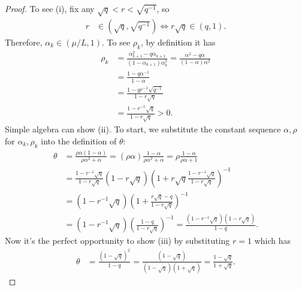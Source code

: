 \documentclass[12pt]{article}
\begin{document}
    \begin{proof}
        To see (i), fix any $\sqrt{q} < r < \sqrt{q^{-1}}$, so
        \begin{align*}
            r &\in \left(\sqrt{q}, \sqrt{q^{-1}}\right)
            \iff 
            r\sqrt{q} \in 
            \left(
                q, 1
            \right). 
        \end{align*}
        Therefore, $\alpha_k \in (\mu/L, 1)$. 
        To see $\rho_k$, by definition it has 
        \begin{align*}
            \rho_k &= \frac{\alpha_{k + 1}^2 - q \alpha_{k + 1}}{(1 - \alpha_{k + 1})\alpha_k^2} 
            = \frac{\alpha^2 - q \alpha}{(1 - \alpha)\alpha^2} 
            \\
            &= \frac{1 - q\alpha^{-1}}{1 - \alpha}
            \\
            &= \frac{1 - q r^{-1}\sqrt{q^{-1}}}{1 - r \sqrt{q}}
            \\
            &= \frac{1 - r^{-1}\sqrt{q}}{1 - r \sqrt{q}} > 0. 
        \end{align*}
        Simple algebra can show (ii). 
        To start, we substitute the constant sequence $\alpha, \rho$ for $\alpha_k, \rho_k$ into the definition of $\theta$: 
        \begin{align*}
            \theta &= \frac{\rho\alpha(1 - \alpha)}{\rho \alpha^2 + \alpha}
            = (\rho\alpha)\frac{1 - \alpha}{\rho \alpha^2 + \alpha} = \rho \frac{1 - \alpha}{\rho \alpha + 1}
            \\
            &= 
            \frac{1 - r^{-1}\sqrt{q}}{1 - r \sqrt{q}}
            (1 - r\sqrt{q})
            \left(
                1 + r\sqrt{q}\frac{1 - r^{-1}\sqrt{q}}{1 - r \sqrt{q}}
            \right)^{-1}
            \\
            &= (1 - r^{-1} \sqrt{q})\left(
                1 + \frac{r \sqrt{q} - q}{1 - r \sqrt{q}}
            \right)^{-1}
            \\
            &= \left(1 - r^{-1} \sqrt{q}\right)\left(
                \frac{1 - q}{1 - r \sqrt{q}}
            \right)^{-1} = \frac{(1 - r^{-1}\sqrt{q})(1 - r \sqrt{q})}{1 - q}. 
        \end{align*}
        Now it's the perfect opportunity to show (iii) by substituting $r = 1$ which has 
        \begin{align*}
            \theta &= \frac{(1 - \sqrt{q})^2}{1 - q}
            =
            \frac{(1 - \sqrt{q})}{(1 - \sqrt{q})(1 + \sqrt{q})}
            = \frac{1 - \sqrt{q}}{1 + \sqrt{q}}. 

\end{align*}
\end{proof}
\end{document}
